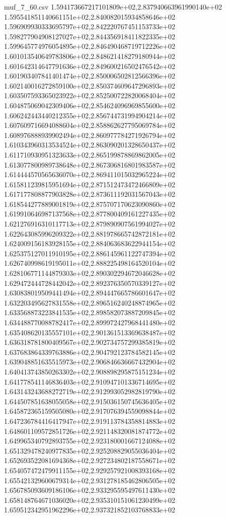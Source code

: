 \begin{filecontents*}{muf_7_60.csv}
1.594173667217101809e+02,2.837940663961990140e+02
1.595541851140661151e+02,2.840082015934858646e+02
1.596909930333695797e+02,2.842220767451153733e+02
1.598277904908127027e+02,2.844356918411822335e+02
1.599645774976054895e+02,2.846490468719712226e+02
1.601013540649783806e+02,2.848621418279180944e+02
1.601642314647791636e+02,2.849600216502476542e+02
1.601903407841401474e+02,2.850006502812566396e+02
1.602140016272859100e+02,2.850374609647296893e+02
1.603507593365023922e+02,2.852500722820068404e+02
1.604875069042309406e+02,2.854624096969855600e+02
1.606242443440212355e+02,2.856744731994904214e+02
1.607609716694088604e+02,2.858862627795069784e+02
1.608976888939902494e+02,2.860977784271926794e+02
1.610343960313534524e+02,2.863090201328650437e+02
1.611710930951323633e+02,2.865199878869862005e+02
1.613077800989738648e+02,2.867306816801983587e+02
1.614444570565636070e+02,2.869411015032965224e+02
1.615811239815951694e+02,2.871512473472466809e+02
1.617177808877903828e+02,2.873611192031567043e+02
1.618544277889001819e+02,2.875707170623090860e+02
1.619910646987137568e+02,2.877800409161227435e+02
1.621276916310117713e+02,2.879890907561994027e+02
1.622643085996209322e+02,2.881978665742872181e+02
1.624009156183928155e+02,2.884063683622944154e+02
1.625375127011910195e+02,2.886145961122747394e+02
1.626740998619195011e+02,2.888225498164520104e+02
1.628106771144879303e+02,2.890302294672046628e+02
1.629472444728442042e+02,2.892376350570339127e+02
1.630838019509441494e+02,2.894447665786601647e+02
1.632203495627831558e+02,2.896516240248874965e+02
1.633568873223841535e+02,2.898582073887209845e+02
1.634488770088782417e+02,2.899972427968441480e+02
1.635408620135557101e+02,2.901361513369638487e+02
1.636318781800409567e+02,2.902734757299385819e+02
1.637683864339763886e+02,2.904792123784582145e+02
1.639048851635515973e+02,2.906846636667432904e+02
1.640413743850263302e+02,2.908898295875151234e+02
1.641778541146836403e+02,2.910947101336714695e+02
1.643143243688272719e+02,2.912993052982819790e+02
1.644507851638055058e+02,2.915036150745636405e+02
1.645872365159505080e+02,2.917076394559098844e+02
1.647236784416417947e+02,2.919113784358814883e+02
1.648601109572851726e+02,2.921148320081874772e+02
1.649965340792893755e+02,2.923180001667124088e+02
1.651329478240977835e+02,2.925208829055036404e+02
1.652693522081694368e+02,2.927234802187558671e+02
1.654057472479911155e+02,2.929257921008393168e+02
1.655421329600679314e+02,2.931278185462806505e+02
1.656785093609186106e+02,2.933295595497611430e+02
1.658148764671036020e+02,2.935310151061230499e+02
1.659512342951962296e+02,2.937321852103768833e+02

\end{filecontents*}

